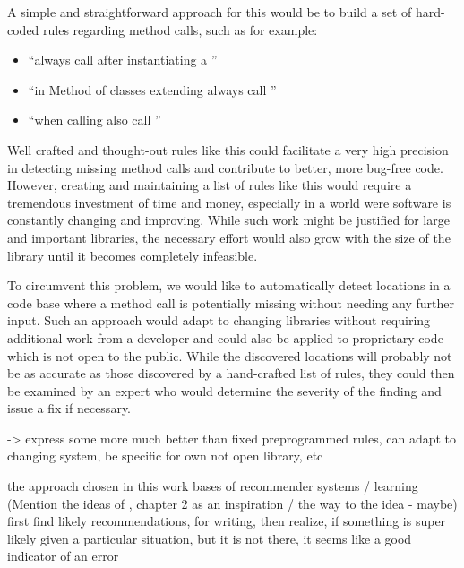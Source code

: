 A simple and straightforward approach for this would be to build a set of hard-coded rules regarding method calls, such as for example:
\begin{itemize}
    \item ``always call  after instantiating a ''
    \item ``in Method  of classes extending  always call ''
    \item ``when calling  also call ''
\end{itemize}
Well crafted and thought-out rules like this could facilitate a very high precision in detecting missing method calls and contribute to better, more bug-free code.
However, creating and maintaining a list of rules like this would require a tremendous investment of time and money, especially in a world were software is constantly changing and improving.
While such work might be justified for large and important libraries, the necessary effort would also grow with the size of the library until it becomes completely infeasible.

To circumvent this problem, we would like to automatically detect locations in a code base where a method call is potentially missing without needing any further input.
Such an approach would adapt to changing libraries without requiring additional work from a developer and could also be applied to proprietary code which is not open to the public.
While the discovered locations will probably not be as accurate as those discovered by a hand-crafted list of rules, they could then be examined by an expert who would determine the severity of the finding and issue a fix if necessary.

-> express some more much better than fixed preprogrammed rules, can adapt to changing system, be specific for own not open library, etc

the approach chosen in this work bases of recommender systems / learning
(Mention the ideas of \cite{bruch2012ide}, chapter 2 as an inspiration / the way to the idea - maybe)
first find likely recommendations, for writing, then realize, if something is super likely given a particular situation, but it is not there, it seems like a good indicator of an error


